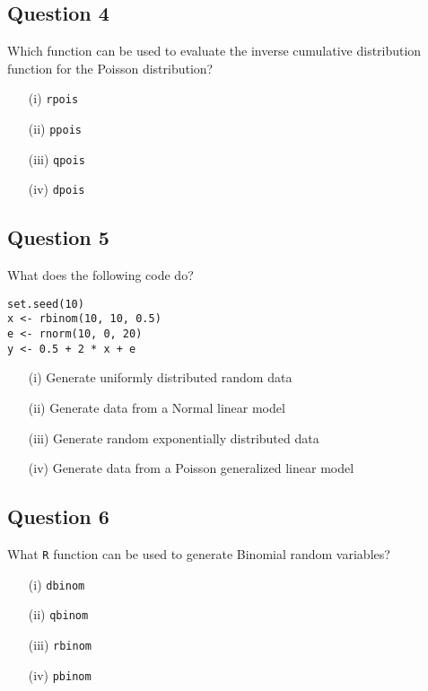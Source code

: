 \documentclass[11pt]{article} %
\begin{document}
\subsection*{Question 4}
Which function can be used to evaluate the inverse cumulative distribution function for the Poisson distribution?

\begin{itemize}
\item[(i)] \texttt{rpois}
\item[(ii)] \texttt{ppois}
\item[(iii)] \texttt{qpois}
\item[(iv)] \texttt{dpois}
\end{itemize}
\newpage
\subsection*{Question 5}
What does the following code do?
\begin{framed}
\begin{verbatim}
set.seed(10)
x <- rbinom(10, 10, 0.5)
e <- rnorm(10, 0, 20)
y <- 0.5 + 2 * x + e
\end{verbatim}
\end{framed}
\begin{itemize}
\item[(i)] Generate uniformly distributed random data
\item[(ii)] Generate data from a Normal linear model
\item[(iii)] Generate random exponentially distributed data
\item[(iv)] Generate data from a Poisson generalized linear model
\end{itemize}
\newpage
\subsection*{Question 6}
What \texttt{R} function can be used to generate Binomial random variables?

\begin{itemize}
\item[(i)] \texttt{dbinom}
\item[(ii)] \texttt{qbinom}
\item[(iii)] \texttt{rbinom}
\item[(iv)] \texttt{pbinom}
\end{itemize}
\newpage
\end{document}
